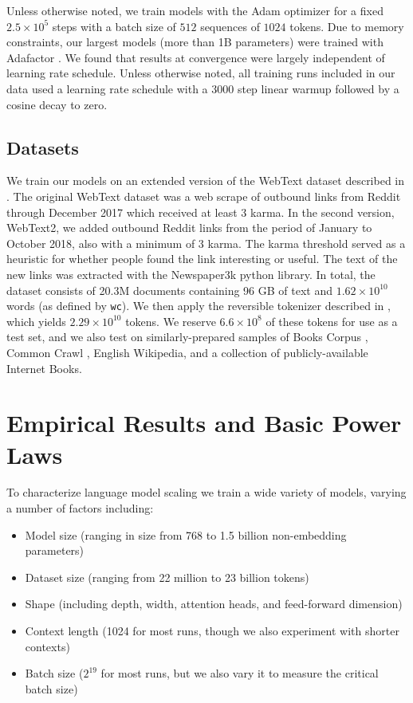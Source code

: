 \documentclass[english]{article}
\renewcommand{\arraystretch}{1.5}
\begin{document}
Unless otherwise noted, we train  models with the Adam optimizer \cite{kingma2014adam} for a fixed $2.5 \times 10^5$  steps with a batch size of $512$ sequences of $1024$ tokens.
Due to memory constraints, our largest models (more than 1B parameters) were trained with Adafactor \cite{DBLP:journals/corr/abs-1804-04235}.
We found that results at convergence were largely independent of learning rate schedule.  Unless otherwise noted, all training runs included in our data used a learning rate schedule with a 3000 step linear warmup followed by a cosine decay to zero.

\subsection{Datasets}
We train our models on an extended version of the WebText dataset described in \cite{radford2019language}.  The original WebText dataset was a web scrape of outbound links from Reddit through December 2017 which received at least 3 karma. In the second version, WebText2, we added outbound Reddit links from the period of January to October 2018, also with a minimum of 3 karma. The karma threshold served as a heuristic for whether people found the link interesting or useful. The text of the new links was extracted with the Newspaper3k python library. In total, the dataset consists of 20.3M documents containing 96 GB of text and $1.62 \times 10^{10}$ words (as defined by \texttt{wc}). We then apply the reversible tokenizer described in \cite{radford2019language}, which yields $2.29 \times 10^{10}$ tokens.  We reserve $6.6 \times 10^{8}$ of these tokens for use as a test set, and we also test on similarly-prepared samples of Books Corpus \cite{Zhu_2015}, Common Crawl \cite{commoncrawl}, English Wikipedia, and a collection of publicly-available Internet Books.



\section{Empirical Results and Basic Power Laws}
\label{sec:Empirical}

To characterize language model scaling we train a wide variety of models, varying a number of factors including:
\begingroup
\renewcommand{\arraystretch}{1.1}
\begin{itemize}
\item Model size (ranging in size from 768 to 1.5 billion non-embedding parameters)
\item Dataset size (ranging from 22 million to 23 billion tokens)
\item Shape (including depth, width, attention heads, and feed-forward dimension)
\item Context length (1024 for most runs, though we also experiment with shorter contexts)
\item Batch size ($2^{19}$ for most runs, but we also vary it to measure the critical batch size)
\end{itemize}
\endgroup 
\end{document}
